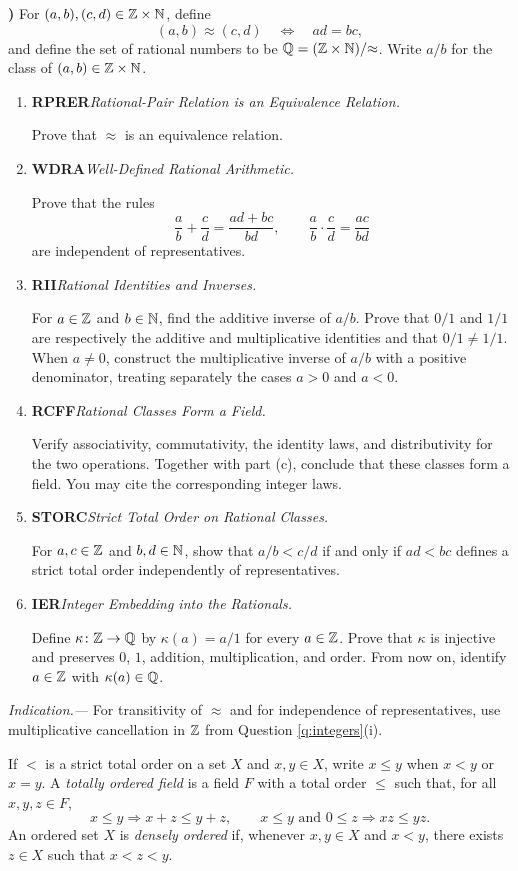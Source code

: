 \documentclass[10pt,a4paper]{article}
\newcounter{examquestion}
\newcommand{\examquestion}[1]{%
  \Needspace{5\baselineskip}%
  \refstepcounter{examquestion}%
  \par\addvspace{0.8\baselineskip}%
  \noindent\textbf{\theexamquestion)}\enspace #1\par
}
\newenvironment{subquestions}
  {\begin{enumerate}[label=\alph*),leftmargin=2.1em]}
  {\end{enumerate}}
\newcommand{\nameditem}[2]{%
  \textbf{\textsf{#1}}\enspace\emph{#2.}\enspace
}
\newcommand{\indication}[1]{%
  \par\smallskip\noindent\emph{Indication.---} #1\par
}
\begin{document}
\examquestion{\label{q:rationals}
For $(a,b),(c,d)\in\mathbb{Z}\times\mathbb{N}$, define
\[
  (a,b)\approx(c,d)\quad\Longleftrightarrow\quad ad=bc,
\]
and define the set of rational numbers to be
$\mathbb{Q}=(\mathbb{Z}\times\mathbb{N})/{\approx}$.  Write $a/b$ for the class of
$(a,b)\in\mathbb{Z}\times\mathbb{N}$.
\begin{subquestions}
  \item \nameditem{RPRER}{Rational-Pair Relation is an Equivalence Relation}
  Prove that $\approx$ is an equivalence relation.
  \item \nameditem{WDRA}{Well-Defined Rational Arithmetic}
  Prove that the rules
  \[
    \frac ab+\frac cd=\frac{ad+bc}{bd},
    \qquad
    \frac ab\cdot\frac cd=\frac{ac}{bd}
  \]
  are independent of representatives.
  \item \nameditem{RII}{Rational Identities and Inverses}
  For $a\in\mathbb{Z}$ and $b\in\mathbb{N}$, find the additive inverse of $a/b$.
  Prove that $0/1$ and $1/1$ are respectively the additive and
  multiplicative identities and that $0/1\ne1/1$.
  When $a\ne0$, construct the multiplicative inverse of $a/b$ with a
  positive denominator, treating separately the cases $a>0$ and $a<0$.
  \item \nameditem{RCFF}{Rational Classes Form a Field}
  Verify associativity, commutativity, the identity laws, and
  distributivity
  for the two operations.  Together with part (c), conclude that these
  classes form a field.  You may cite the corresponding integer laws.
  \item \nameditem{STORC}{Strict Total Order on Rational Classes}
  For $a,c\in\mathbb{Z}$ and $b,d\in\mathbb{N}$, show that $a/b<c/d$ if and only if
  $ad<bc$ defines a strict total order independently of representatives.
  \item \nameditem{IER}{Integer Embedding into the Rationals}
  Define $\kappa\colon\mathbb{Z}\to\mathbb{Q}$ by
  $\kappa(a)=a/1$ for every $a\in\mathbb{Z}$.  Prove that $\kappa$ is injective
  and preserves $0$, $1$, addition, multiplication, and order.  From now
  on, identify $a\in\mathbb{Z}$ with $\kappa(a)\in\mathbb{Q}$.
\end{subquestions}}
\indication{For transitivity of $\approx$ and for independence of
representatives, use multiplicative cancellation in $\mathbb{Z}$ from Question
\ref{q:integers}(i).}

If $<$ is a strict total order on a set $X$ and $x,y\in X$, write
$x\leq y$ when $x<y$ or $x=y$.  A \emph{totally ordered field} is a
field $F$ with a total order $\leq$ such that, for all $x,y,z\in F$,
\[
  x\leq y\Longrightarrow x+z\leq y+z,
  \qquad
  x\leq y\text{ and }0\leq z\Longrightarrow xz\leq yz.
\]
An ordered set $X$ is \emph{densely ordered} if, whenever $x,y\in X$ and
$x<y$, there exists $z\in X$ such that $x<z<y$.
\end{document}
